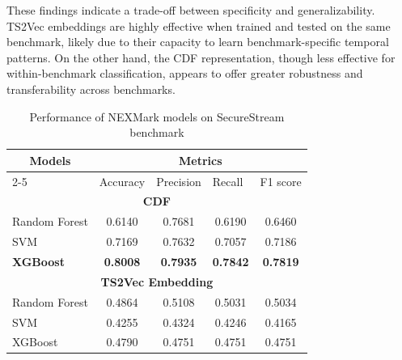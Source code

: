 These findings indicate a trade-off between specificity and generalizability. TS2Vec embeddings are highly effective when trained and tested on the same benchmark, likely due to their capacity to learn benchmark-specific temporal patterns. On the other hand, the CDF representation, though less effective for within-benchmark classification, appears to offer greater robustness and transferability across benchmarks.

\begin{table}
\centering
\caption{Performance of NEXMark models on SecureStream benchmark}
\label{tab:cross_performances}
\begin{tabular}{lcccc}
\hline
\multicolumn{1}{c}{\multirow{2}{*}{\textbf{Models}}} & \multicolumn{4}{c}{\textbf{Metrics}}                                                                                     \\ \cline{2-5} 
\multicolumn{1}{c}{}                                 & \multicolumn{1}{l}{Accuracy} & \multicolumn{1}{l}{Precision} & \multicolumn{1}{l}{Recall} & \multicolumn{1}{l}{F1 score} \\ \hline
\multicolumn{5}{c}{\textbf{CDF}}                                                                                                                                                \\ \hline
Random Forest                                        & 0.6140                       & 0.7681                        & 0.6190                     & 0.6460                       \\
SVM                                                  & 0.7169                       & 0.7632                        & 0.7057                     & 0.7186                       \\
\textbf{XGBoost}                                              & \textbf{0.8008}                       & \textbf{0.7935}                        & \textbf{0.7842}                     & \textbf{0.7819}                       \\ \hline
\multicolumn{5}{c}{\textbf{TS2Vec Embedding}}                                                                                                                                   \\ \hline
Random Forest                                        & 0.4864                       & 0.5108                        & 0.5031                     & 0.5034                       \\
SVM                                                  & 0.4255                       & 0.4324                        & 0.4246                     & 0.4165                       \\
XGBoost                                              & 0.4790                       & 0.4751                        & 0.4751                     & 0.4751                       \\ \hline
\end{tabular}
\end{table}

